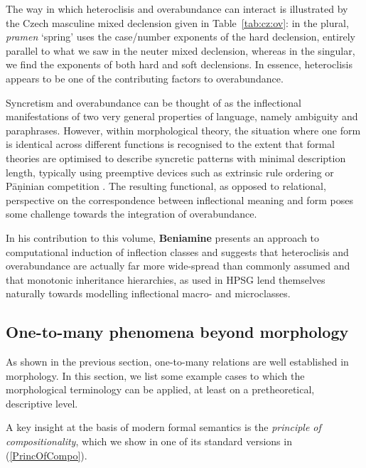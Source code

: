 \documentclass[output=paper]{langscibook}
\begin{document}
The way in which heteroclisis and overabundance can interact is
illustrated by the Czech masculine mixed declension given in
Table~\ref{tab:cz:ov}: in the plural, \textit{pramen} `spring' uses
the case/number exponents of the hard declension, entirely parallel to
what we saw in the neuter mixed declension, whereas in the singular,
we find the exponents of both hard and soft declensions. In essence,
heteroclisis appears to be one of the contributing factors to
overabundance.

Syncretism and overabundance can be thought of as the inflectional
manifestations of two very general properties of language, namely
ambiguity and paraphrases. However, within morphological theory, the
situation where one form is identical across different functions is
recognised to the extent that formal theories are optimised to
describe syncretic patterns with minimal description length, typically
using preemptive devices such as extrinsic rule ordering
\citep{Anderson92} or Pāṇinian competition
\citep{Kiparsky05,Stump01,Prince93,Embick07}. The resulting functional, as
opposed to relational, perspective on the correspondence between
inflectional meaning and form poses some challenge towards the
integration of overabundance.

In his contribution to this volume, \textbf{Beniamine} presents an
approach to computational induction of inflection classes and suggests
that heteroclisis and overabundance are actually far more wide-spread
than commonly assumed and that monotonic inheritance hierarchies, as
used in HPSG lend themselves naturally towards modelling inflectional
macro- and microclasses.

\subsection{One-to-many phenomena beyond morphology}

As shown in the previous section, one-to-many relations are well
established in morphology.  In this section, we list some example
cases to which the morphological terminology can be applied, at least
on a pretheoretical, descriptive level.

A key insight at the basis of modern formal semantics is the
\emph{principle of compositionality}, which we show in one of its
standard versions in (\ref{PrincOfCompo}).
\end{document}
